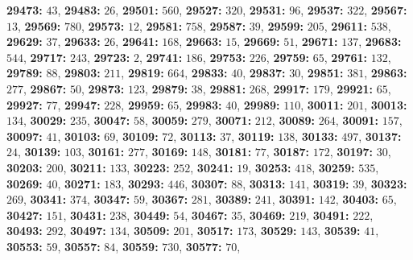 \textsf{\bfseries 29473:} $43$, \textsf{\bfseries 29483:} $26$, \textsf{\bfseries 29501:} $560$, \textsf{\bfseries 29527:} $320$, \textsf{\bfseries 29531:} $96$, \textsf{\bfseries 29537:} $322$, \textsf{\bfseries 29567:} $13$, \textsf{\bfseries 29569:} $780$, \textsf{\bfseries 29573:} $12$, \textsf{\bfseries 29581:} $758$, \textsf{\bfseries 29587:} $39$, \textsf{\bfseries 29599:} $205$, \textsf{\bfseries 29611:} $538$, \textsf{\bfseries 29629:} $37$, \textsf{\bfseries 29633:} $26$, \textsf{\bfseries 29641:} $168$, \textsf{\bfseries 29663:} $15$, \textsf{\bfseries 29669:} $51$, \textsf{\bfseries 29671:} $137$, \textsf{\bfseries 29683:} $544$, \textsf{\bfseries 29717:} $243$, \textsf{\bfseries 29723:} $2$, \textsf{\bfseries 29741:} $186$, \textsf{\bfseries 29753:} $226$, \textsf{\bfseries 29759:} $65$, \textsf{\bfseries 29761:} $132$, \textsf{\bfseries 29789:} $88$, \textsf{\bfseries 29803:} $211$, \textsf{\bfseries 29819:} $664$, \textsf{\bfseries 29833:} $40$, \textsf{\bfseries 29837:} $30$, \textsf{\bfseries 29851:} $381$, \textsf{\bfseries 29863:} $277$, \textsf{\bfseries 29867:} $50$, \textsf{\bfseries 29873:} $123$, \textsf{\bfseries 29879:} $38$, \textsf{\bfseries 29881:} $268$, \textsf{\bfseries 29917:} $179$, \textsf{\bfseries 29921:} $65$, \textsf{\bfseries 29927:} $77$, \textsf{\bfseries 29947:} $228$, \textsf{\bfseries 29959:} $65$, \textsf{\bfseries 29983:} $40$, \textsf{\bfseries 29989:} $110$, \textsf{\bfseries 30011:} $201$, \textsf{\bfseries 30013:} $134$, \textsf{\bfseries 30029:} $235$, \textsf{\bfseries 30047:} $58$, \textsf{\bfseries 30059:} $279$, \textsf{\bfseries 30071:} $212$, \textsf{\bfseries 30089:} $264$, \textsf{\bfseries 30091:} $157$, \textsf{\bfseries 30097:} $41$, \textsf{\bfseries 30103:} $69$, \textsf{\bfseries 30109:} $72$, \textsf{\bfseries 30113:} $37$, \textsf{\bfseries 30119:} $138$, \textsf{\bfseries 30133:} $497$, \textsf{\bfseries 30137:} $24$, \textsf{\bfseries 30139:} $103$, \textsf{\bfseries 30161:} $277$, \textsf{\bfseries 30169:} $148$, \textsf{\bfseries 30181:} $77$, \textsf{\bfseries 30187:} $172$, \textsf{\bfseries 30197:} $30$, \textsf{\bfseries 30203:} $200$, \textsf{\bfseries 30211:} $133$, \textsf{\bfseries 30223:} $252$, \textsf{\bfseries 30241:} $19$, \textsf{\bfseries 30253:} $418$, \textsf{\bfseries 30259:} $535$, \textsf{\bfseries 30269:} $40$, \textsf{\bfseries 30271:} $183$, \textsf{\bfseries 30293:} $446$, \textsf{\bfseries 30307:} $88$, \textsf{\bfseries 30313:} $141$, \textsf{\bfseries 30319:} $39$, \textsf{\bfseries 30323:} $269$, \textsf{\bfseries 30341:} $374$, \textsf{\bfseries 30347:} $59$, \textsf{\bfseries 30367:} $281$, \textsf{\bfseries 30389:} $241$, \textsf{\bfseries 30391:} $142$, \textsf{\bfseries 30403:} $65$, \textsf{\bfseries 30427:} $151$, \textsf{\bfseries 30431:} $238$, \textsf{\bfseries 30449:} $54$, \textsf{\bfseries 30467:} $35$, \textsf{\bfseries 30469:} $219$, \textsf{\bfseries 30491:} $222$, \textsf{\bfseries 30493:} $292$, \textsf{\bfseries 30497:} $134$, \textsf{\bfseries 30509:} $201$, \textsf{\bfseries 30517:} $173$, \textsf{\bfseries 30529:} $143$, \textsf{\bfseries 30539:} $41$, \textsf{\bfseries 30553:} $59$, \textsf{\bfseries 30557:} $84$, \textsf{\bfseries 30559:} $730$, \textsf{\bfseries 30577:} $70$, 
